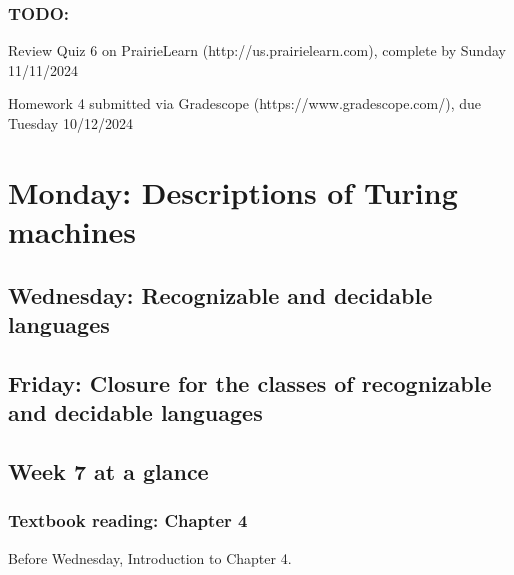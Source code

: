 \vspace{-20pt}

\subsubsection*{TODO:}
\begin{list}{\itemsep -20pt}
   \item Review Quiz 6 on PrairieLearn (http://us.prairielearn.com), complete by Sunday 11/11/2024
   \item Homework 4 submitted via Gradescope (https://www.gradescope.com/), due Tuesday 10/12/2024
\end{list}

\newpage

\section*{Monday: Descriptions of Turing machines}


    
\newpage
\subsection*{Wednesday: Recognizable and decidable languages}




\newpage
\subsection*{Friday: Closure for the classes of recognizable and decidable languages}





\newpage

\subsection*{Week 7 at a glance}

\subsubsection*{Textbook reading: Chapter 4}

\vspace{-20pt}

Before Wednesday, Introduction to Chapter 4.

